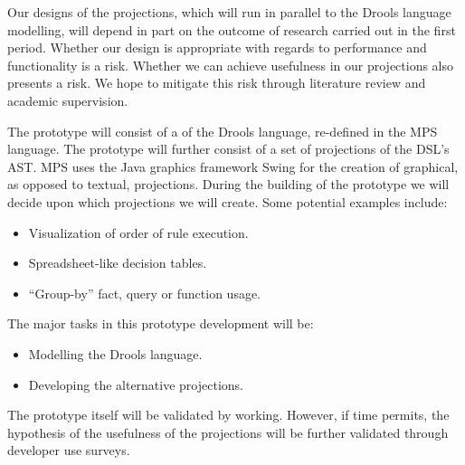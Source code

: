 Our designs of the projections, which will run in parallel to the Drools language modelling, will depend in part on the outcome of research carried out in the first period.
Whether our design is appropriate with regards to performance and functionality is a risk. 
Whether we can achieve usefulness in our projections also presents a risk.
We hope to mitigate this risk through literature review and academic supervision.

The prototype will consist of a of the Drools language, re-defined in the MPS language.  
The prototype will further consist of a set of projections of the DSL's AST.
MPS uses the Java graphics framework Swing for the creation of graphical, as opposed to textual, projections.
During the building of the prototype we will decide upon which projections we will create. Some potential examples include:
\begin{itemize}
    \item Visualization of order of rule execution.
    \item Spreadsheet-like decision tables.
    \item ``Group-by'' fact, query or function usage.
\end{itemize}


The major tasks in this prototype development will be: 
\begin{itemize}
    \item Modelling the Drools language.
    \item Developing the alternative projections.
\end{itemize}

The prototype itself will be validated by working.
However, if time permits, the hypothesis of the usefulness of the projections will be further validated through developer use surveys.

